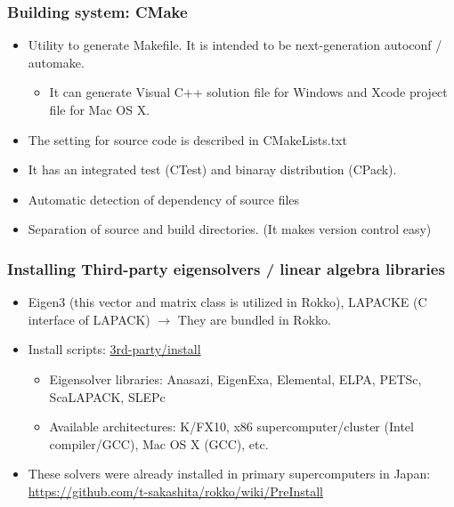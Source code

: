 \begin{frame}
  \frametitle{Building system: CMake}
  \begin{itemize}
    \setlength{\itemsep}{1em}
  \item Utility to generate Makefile. It is intended to be next-generation autoconf / automake.
    \begin{itemize}
    \item It can generate Visual C++ solution file for Windows and Xcode project file for Mac OS X.
    \end{itemize}
  \item The setting for source code is described in CMakeLists.txt
  \item It has an integrated test (CTest) and binaray distribution (CPack).
  \item Automatic detection of dependency of source files
  \item Separation of source and build directories. (It makes version control easy)
  \end{itemize}
\end{frame}

\begin{frame}
  \frametitle{Installing Third-party eigensolvers / linear algebra libraries}
  \begin{itemize}
    \setlength{\itemsep}{1em}
  \item Eigen3 (this vector and matrix class is utilized in Rokko), LAPACKE (C interface of LAPACK) $\rightarrow$ They are bundled in Rokko.
  \item Install scripts: \href{https://github.com/t-sakashita/rokko/tree/master/3rd-party/install}{3rd-party/install}
    \begin{itemize}
      \item Eigensolver libraries: Anasazi, EigenExa, Elemental, ELPA, PETSc, ScaLAPACK, SLEPc
      \item Available architectures: K/FX10, x86 supercomputer/cluster (Intel compiler/GCC), Mac OS X (GCC), etc.
    \end{itemize}
  \item These solvers were already installed in primary supercomputers in Japan: \url{https://github.com/t-sakashita/rokko/wiki/PreInstall}
  \end{itemize}
\end{frame}

